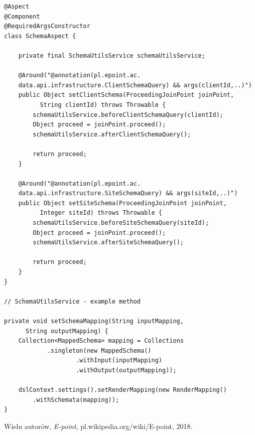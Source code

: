 \documentclass[licencjacka]{pracamgr}
\begin{document}
\begin{lstlisting}
@Aspect
@Component
@RequiredArgsConstructor
class SchemaAspect {

    private final SchemaUtilsService schemaUtilsService;

    @Around("@annotation(pl.epoint.ac.
    data.api.infrastructure.ClientSchemaQuery) && args(clientId,..)")
    public Object setClientSchema(ProceedingJoinPoint joinPoint, 
          String clientId) throws Throwable {
        schemaUtilsService.beforeClientSchemaQuery(clientId);
        Object proceed = joinPoint.proceed();
        schemaUtilsService.afterClientSchemaQuery();

        return proceed;
    }

    @Around("@annotation(pl.epoint.ac.
    data.api.infrastructure.SiteSchemaQuery) && args(siteId,..)")
    public Object setSiteSchema(ProceedingJoinPoint joinPoint, 
          Integer siteId) throws Throwable {
        schemaUtilsService.beforeSiteSchemaQuery(siteId);
        Object proceed = joinPoint.proceed();
        schemaUtilsService.afterSiteSchemaQuery();

        return proceed;
    }
}

// SchemaUtilsService - example method

private void setSchemaMapping(String inputMapping, 
      String outputMapping) {
    Collection<MappedSchema> mapping = Collections
            .singleton(new MappedSchema()
                    .withInput(inputMapping)
                    .withOutput(outputMapping));

    dslContext.settings().setRenderMapping(new RenderMapping()
        .withSchemata(mapping));
}
\end{lstlisting}


\begin{thebibliography}{99}

 Wielu autorów, \textit{E-point}, pl.wikipedia.org/wiki/E-point, 2018.



\end{thebibliography}
\end{document}
